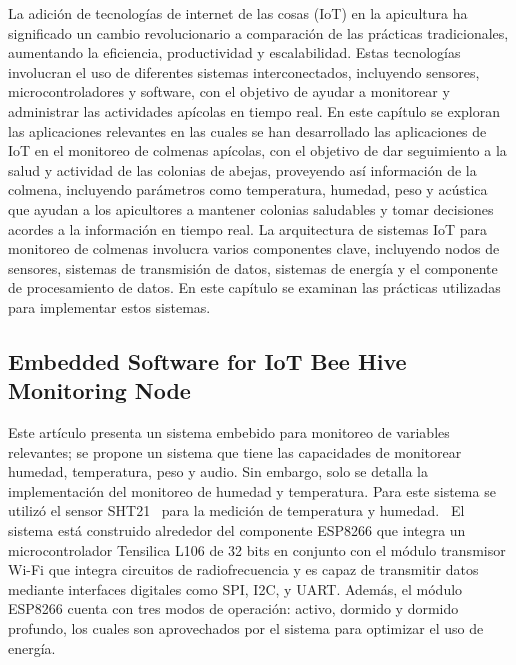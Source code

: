 La adición de tecnologías de internet de las cosas (IoT) en la apicultura ha significado un cambio revolucionario a comparación de las prácticas tradicionales, aumentando la eficiencia, productividad y escalabilidad. Estas tecnologías involucran el uso de diferentes sistemas interconectados, incluyendo sensores, microcontroladores y software, con el objetivo de ayudar a monitorear y administrar las actividades apícolas en tiempo real.
En este capítulo se exploran las aplicaciones relevantes en las cuales se han desarrollado las aplicaciones de IoT en el monitoreo de colmenas apícolas, con el objetivo de dar seguimiento a la salud y actividad de las colonias de abejas, proveyendo así información de la colmena, incluyendo parámetros como temperatura, humedad, peso y acústica que ayudan a los apicultores a mantener colonias saludables y tomar decisiones acordes a la información en tiempo real.
La arquitectura de sistemas IoT para monitoreo de colmenas involucra varios componentes clave, incluyendo nodos de sensores, sistemas de transmisión de datos, sistemas de energía y el componente de procesamiento de datos. En este capítulo se examinan las prácticas utilizadas para implementar estos sistemas.

\subsection{Embedded Software for IoT Bee Hive Monitoring Node}
Este artículo presenta un sistema embebido para monitoreo de variables relevantes; se propone un sistema que tiene las capacidades de monitorear humedad, temperatura, peso y audio. Sin embargo, solo se detalla la implementación del monitoreo de humedad y temperatura. Para este sistema se utilizó el sensor SHT21~\cite{sht21} para la medición de temperatura y humedad.~\cite{vidrascu_svasta_2017a}  
El sistema está construido alrededor del componente ESP8266 que integra un microcontrolador Tensilica L106 de 32 bits en conjunto con el módulo transmisor Wi-Fi que integra circuitos de radiofrecuencia y es capaz de transmitir datos mediante interfaces digitales como SPI, I2C, y UART. Además, el módulo ESP8266 cuenta con tres modos de operación: activo, dormido y dormido profundo, los cuales son aprovechados por el sistema para optimizar el uso de energía.~\cite{vidrascu_svasta_2017a}

